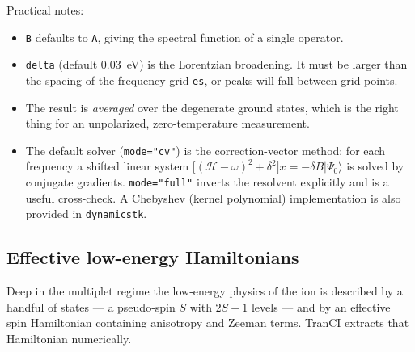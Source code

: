 \documentclass[11pt,a4paper]{article}
\newcommand{\op}[1]{\texttt{#1}}
\begin{document}
\noindent
Practical notes:
\begin{itemize}
\item \op{B} defaults to \op{A}, giving the spectral function of a single
      operator.
\item \op{delta} (default $0.03$~eV) is the Lorentzian broadening.  It must be
      larger than the spacing of the frequency grid \op{es}, or peaks will fall
      between grid points.
\item The result is \emph{averaged} over the degenerate ground states, which is
      the right thing for an unpolarized, zero-temperature measurement.
\item The default solver (\op{mode="cv"}) is the correction-vector method: for
      each frequency a shifted linear system
      $\big[(\mathcal{H}-\omega)^2+\delta^2\big]x = -\delta B|\Psi_0\rangle$
      is solved by conjugate gradients.  \op{mode="full"} inverts the resolvent
      explicitly and is a useful cross-check.  A Chebyshev (kernel polynomial)
      implementation is also provided in \op{dynamicstk}.
\end{itemize}

\subsection{Effective low-energy Hamiltonians}
\label{sec:heff}

Deep in the multiplet regime the low-energy physics of the ion is described by a
handful of states --- a pseudo-spin $S$ with $2S+1$ levels --- and by an
effective spin Hamiltonian containing anisotropy and Zeeman terms.  TranCI
extracts that Hamiltonian numerically.
\end{document}
